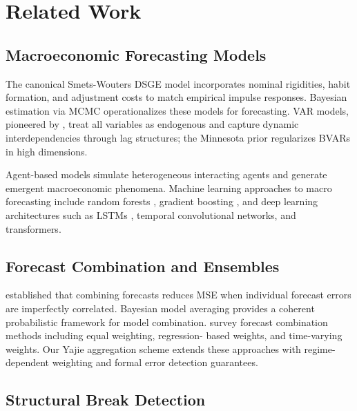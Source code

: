 \documentclass[12pt,a4paper]{article}
\begin{document}
\section{Related Work}
\label{sec:related}

\subsection{Macroeconomic Forecasting Models}

The canonical Smets-Wouters DSGE model \citep{smets2007shocks} incorporates
nominal rigidities, habit formation, and adjustment costs to match
empirical impulse responses.  Bayesian estimation via MCMC
\citep{an2007bayesian} operationalizes these models for forecasting.
VAR models, pioneered by \citet{sims1980macroeconomics}, treat all
variables as endogenous and capture dynamic interdependencies through
lag structures; the Minnesota prior \citep{litterman1986forecasting}
regularizes BVARs in high dimensions.

Agent-based models \citep{tesfatsion2006agent, dawid2019agent} simulate
heterogeneous interacting agents and generate emergent macroeconomic
phenomena.  Machine learning approaches to macro forecasting include
random forests \citep{medeiros2021forecasting}, gradient boosting
\citep{coulombe2020can}, and deep learning architectures such as LSTMs
\citep{verstyuk2020modeling}, temporal convolutional networks, and
transformers.

\subsection{Forecast Combination and Ensembles}

\citet{bates1969combination} established that combining forecasts reduces
MSE when individual forecast errors are imperfectly correlated.  Bayesian
model averaging \citep{hoeting1999bayesian} provides a coherent
probabilistic framework for model combination.  \citet{timmermann2006forecast}
survey forecast combination methods including equal weighting, regression-
based weights, and time-varying weights.  Our Yajie aggregation scheme
extends these approaches with regime-dependent weighting and formal
error detection guarantees.

\subsection{Structural Break Detection}
\end{document}
